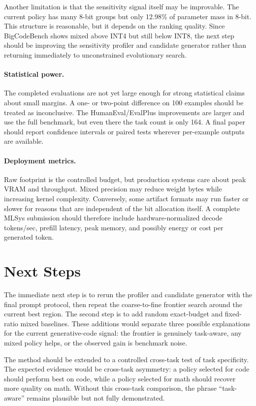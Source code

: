 \documentclass{article}
\begin{document}
Another limitation is that the sensitivity signal itself may be improvable. The current policy has many 8-bit groups but only 12.98\% of parameter mass in 8-bit. This structure is reasonable, but it depends on the ranking quality. Since BigCodeBench shows mixed above INT4 but still below INT8, the next step should be improving the sensitivity profiler and candidate generator rather than returning immediately to unconstrained evolutionary search.

\paragraph{Statistical power.}
The completed evaluations are not yet large enough for strong statistical claims about small margins. A one- or two-point difference on 100 examples should be treated as inconclusive. The HumanEval/EvalPlus improvements are larger and use the full benchmark, but even there the task count is only 164. A final paper should report confidence intervals or paired tests wherever per-example outputs are available.

\paragraph{Deployment metrics.}
Raw footprint is the controlled budget, but production systems care about peak VRAM and throughput. Mixed precision may reduce weight bytes while increasing kernel complexity. Conversely, some artifact formats may run faster or slower for reasons that are independent of the bit allocation itself. A complete MLSys submission should therefore include hardware-normalized decode tokens/sec, prefill latency, peak memory, and possibly energy or cost per generated token.

\section{Next Steps}

The immediate next step is to rerun the profiler and candidate generator with the final prompt protocol, then repeat the coarse-to-fine frontier search around the current best region. The second step is to add random exact-budget and fixed-ratio mixed baselines. These additions would separate three possible explanations for the current generative-code signal: the frontier is genuinely task-aware, any mixed policy helps, or the observed gain is benchmark noise.

The method should be extended to a controlled cross-task test of task specificity. The expected evidence would be cross-task asymmetry: a policy selected for code should perform best on code, while a policy selected for math should recover more quality on math. Without this cross-task comparison, the phrase ``task-aware'' remains plausible but not fully demonstrated.
\end{document}
